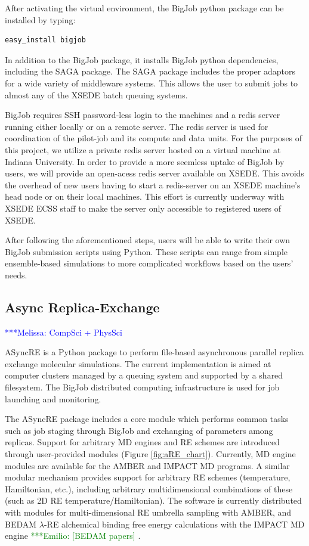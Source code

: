 \documentclass{sig-alternate}
\newcommand{\mrnote}[1]{ {\textcolor{blue} { ***Melissa: #1 }}}
\newcommand{\egnote}[1]{ {\textcolor{green} { ***Emilio: #1 }}}
\begin{document}
After activating the virtual environment, the BigJob python package
can be installed by typing:

\begin{lstlisting}[frame=single]
easy_install bigjob
\end{lstlisting}

In addition to the BigJob package, it installs BigJob python
dependencies, including the SAGA package. The SAGA package includes
the proper adaptors for a wide variety of middleware systems. This
allows the user to submit jobs to almost any of the XSEDE batch
queuing systems.

BigJob requires SSH password-less login to the machines and a redis
server running either locally or on a remote server. The redis server
is used for coordination of the pilot-job and its compute and data
units. For the purposes of this project, we utilize a private redis
server hosted on a virtual machine at Indiana University. In order to
provide a more seemless uptake of BigJob by users, we will provide an
open-acess redis server available on XSEDE. This avoids the overhead
of new users having to start a redis-server on an XSEDE machine's head
node or on their local machines. This effort is currently underway
with XSEDE ECSS staff to make the server only accessible to registered
users of XSEDE.

After following the aforementioned steps, users will be able to write
their own BigJob submission scripts using Python. These scripts can
range from simple ensemble-based simulations to more complicated
workflows based on the users' needs.

\subsection{Async Replica-Exchange}
\mrnote{CompSci + PhysSci}

ASyncRE is a Python package to perform file-based asynchronous
parallel replica exchange molecular simulations. The current
implementation is aimed at computer clusters managed by a queuing
system and supported by a shared filesystem. The BigJob distributed
computing infrastructure is used for job launching and monitoring.

The ASyncRE package includes a core module which performs common tasks
such as job staging through BigJob and exchanging of parameters among
replicas. Support for arbitrary MD engines and RE schemes are
introduced through user-provided modules (Figure \ref{fig:aRE_chart}). Currently, MD
engine modules are available for the AMBER and IMPACT MD programs. A
similar modular mechanism provides support for arbitrary RE schemes
(temperature, Hamiltonian, etc.), including arbitrary multidimensional
combinations of these (such as 2D RE temperature/Hamiltonian). The
software is currently distributed with modules for multi-dimensional RE
umbrella sampling with AMBER\cite{AMBER12}, and BEDAM $\lambda$-RE alchemical binding
free energy calculations with the IMPACT MD engine \egnote{[BEDAM papers]}.
\end{document}
